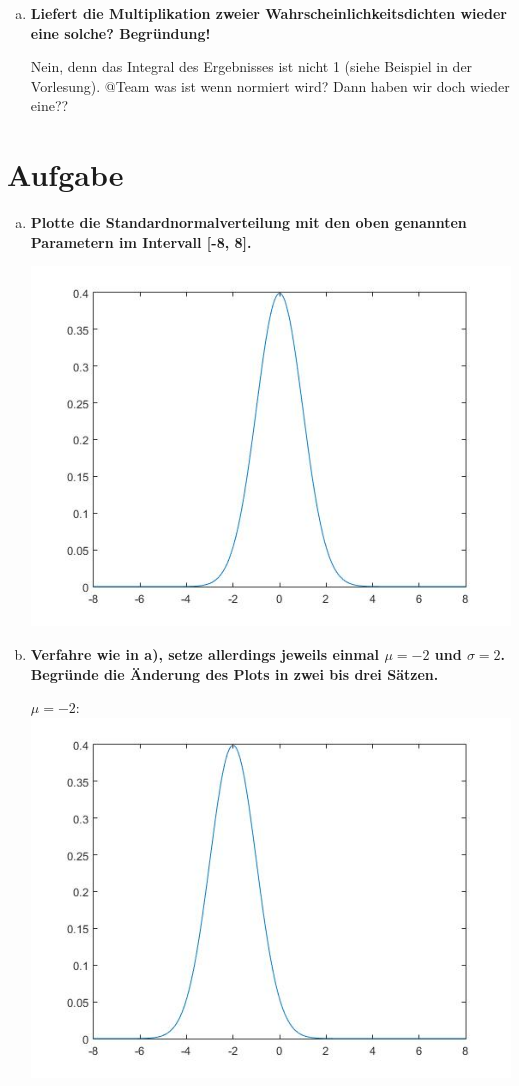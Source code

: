 \documentclass[a4paper]{scrartcl}
\begin{document}
\begin{enumerate}[a)]
	\item \textbf{Liefert die Multiplikation zweier Wahrscheinlichkeitsdichten wieder eine solche? Begründung!}
	
	Nein, denn das Integral des Ergebnisses ist nicht 1 (siehe Beispiel in der Vorlesung). @Team was ist wenn normiert wird? Dann haben wir doch wieder eine??
\end{enumerate}

\section{Aufgabe}

\begin{enumerate}[a)]
	\item \textbf{Plotte die Standardnormalverteilung mit den oben genannten Parametern im Intervall [-8, 8].}
		
	\includegraphics[width=.6\textwidth]{plots/2a_mu0_sigma1.jpg}
		
	
	\item \textbf{Verfahre wie in a), setze allerdings jeweils einmal $\mu = -2$ und $\sigma = 2$. Begründe die Änderung des Plots in zwei bis drei Sätzen.}
	
	$\mu = -2$:\\
	\includegraphics[width=.6\textwidth]{plots/2b_mu-2_sigma1.jpg}
	

\end{enumerate}
\end{document}
